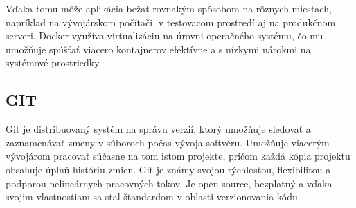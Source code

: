 Vďaka tomu môže aplikácia bežať rovnakým spôsobom na rôznych miestach, napríklad na vývojárskom počítači, v testovacom prostredí aj na produkčnom serveri. 
Docker využíva virtualizáciu na úrovni operačného systému, čo mu umožňuje spúšťať viacero kontajnerov efektívne a s nízkymi nárokmi na systémové prostriedky.\cite{docker}
\subsection{GIT}
Git je distribuovaný systém na správu verzií, ktorý umožňuje sledovať a zaznamenávať zmeny v súboroch počas vývoja softvéru.
 Umožňuje viacerým vývojárom pracovať súčasne na tom istom projekte, pričom každá kópia projektu obsahuje úplnú históriu zmien. 
 Git je známy svojou rýchlosťou, flexibilitou a podporou nelineárnych pracovných tokov. 
Je open-source, bezplatný a vďaka svojim vlastnostiam sa stal štandardom v oblasti verzionovania kódu.\cite{git}